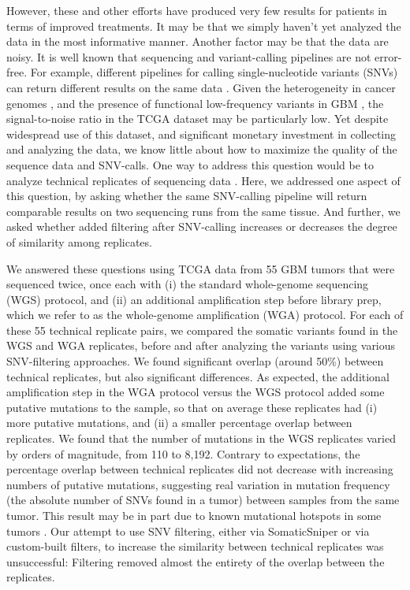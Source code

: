 \documentclass[11 pt]{article} %
\begin{document}
However, these and other efforts have produced very few results for patients in terms of improved treatments. It may be that we simply haven't yet analyzed the data in the most informative manner. Another factor may be that the data are noisy. It is well known that sequencing and variant-calling pipelines are not error-free. For example, different pipelines for calling single-nucleotide variants (SNVs) can return different results on the same data \citep{SNPcall}. Given the heterogeneity in cancer genomes \citep{heterogenous1, heterogenous2}, and the presence of functional low-frequency variants in GBM \citep{rare}, the signal-to-noise ratio in the TCGA dataset may be particularly low. Yet despite widespread use of this dataset, and significant monetary investment in collecting and analyzing the data, we know little about how to maximize the quality of the sequence data and SNV-calls. One way to address this question would be to analyze technical replicates of sequencing data \citep{replicates}. Here, we addressed one aspect of this question, by asking whether the same SNV-calling pipeline will return comparable results on two sequencing runs from the same tissue. And further, we asked whether added filtering after SNV-calling increases or decreases the degree of similarity among replicates.

We answered these questions using TCGA data from 55 GBM tumors that were sequenced twice, once each with (i) the standard whole-genome sequencing (WGS) protocol, and (ii) an additional amplification step before library prep, which we refer to as the whole-genome amplification (WGA) protocol. For each of these 55 technical replicate pairs, we compared the somatic variants found in the WGS and WGA replicates, before and after analyzing the variants using various SNV-filtering approaches. We found significant overlap (around 50\%) between technical replicates, but also significant differences. As expected, the additional amplification step in the WGA protocol versus the WGS protocol added some putative mutations to the sample, so that on average these replicates had (i) more putative mutations, and (ii) a smaller percentage overlap between replicates. We found that the number of mutations in the WGS replicates varied by orders of magnitude, from 110 to 8,192. Contrary to expectations, the percentage overlap between technical replicates did not decrease with increasing numbers of putative mutations, suggesting real variation in mutation frequency (the absolute number of SNVs found in a tumor) between samples from the same tumor. This result may be in part due to known mutational hotspots in some tumors \citep{Karen}. Our attempt to use SNV filtering, either via SomaticSniper \citep{SomaticSniper} or via custom-built filters, to increase the similarity between technical replicates was unsuccessful: Filtering removed almost the entirety of the overlap between the replicates.
\end{document}
